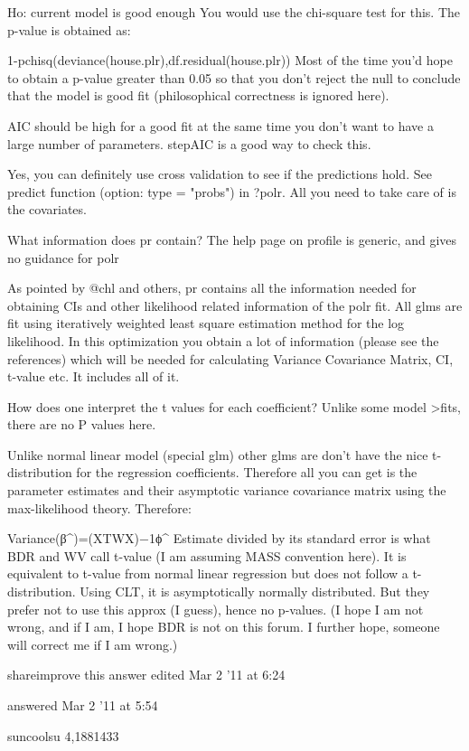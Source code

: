 Ho: current model is good enough 
You would use the chi-square test for this. The p-value is obtained as:

1-pchisq(deviance(house.plr),df.residual(house.plr))
Most of the time you'd hope to obtain a p-value greater than 0.05 so that you don't reject the null to conclude that the model is good fit (philosophical correctness is ignored here).

AIC should be high for a good fit at the same time you don't want to have a large number of parameters. stepAIC is a good way to check this.

Yes, you can definitely use cross validation to see if the predictions hold. See predict function (option: type = "probs") in ?polr. All you need to take care of is the covariates.

What information does pr contain? The help page on profile is generic, and gives no guidance for polr

As pointed by @chl and others, pr contains all the information needed for obtaining CIs and other likelihood related information of the polr fit. All glms are fit using iteratively weighted least square estimation method for the log likelihood. In this optimization you obtain a lot of information (please see the references) which will be needed for calculating Variance Covariance Matrix, CI, t-value etc. It includes all of it.

How does one interpret the t values for each coefficient? Unlike some model >fits, there are no P values here.

Unlike normal linear model (special glm) other glms are don't have the nice t-distribution for the regression coefficients. Therefore all you can get is the parameter estimates and their asymptotic variance covariance matrix using the max-likelihood theory. Therefore:

Variance(β^)=(XTWX)−1ϕ^
Estimate divided by its standard error is what BDR and WV call t-value (I am assuming MASS convention here). It is equivalent to t-value from normal linear regression but does not follow a t-distribution. Using CLT, it is asymptotically normally distributed. But they prefer not to use this approx (I guess), hence no p-values. (I hope I am not wrong, and if I am, I hope BDR is not on this forum. I further hope, someone will correct me if I am wrong.)

shareimprove this answer
edited Mar 2 '11 at 6:24

answered Mar 2 '11 at 5:54

suncoolsu
4,1881433
  	 	
